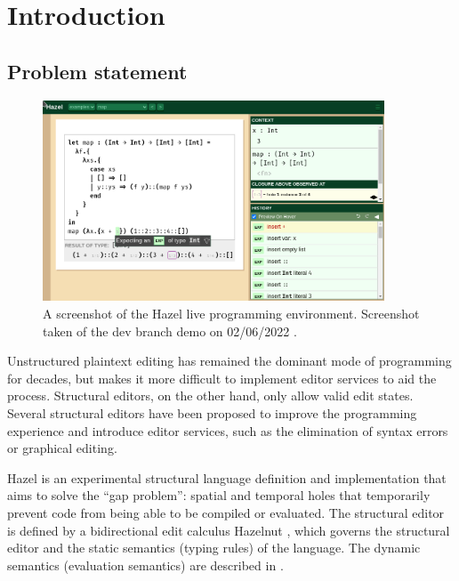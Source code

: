 \section{Introduction}
\label{sec:introduction}

\subsection{Problem statement}
\label{sec:prob_stmt}

\begin{figure}
  \centering
  \includegraphics[width=4in]{img/hazel_ui.png}
  \caption[Screenshot of the Hazel live programming environment.]{A screenshot of the Hazel live programming environment. Screenshot taken of the dev branch demo on 02/06/2022 \cite{HazelDemo2022}.}
  \label{fig:screenshot-hazel-ui}
\end{figure}

Unstructured plaintext editing has remained the dominant mode of programming for decades, but makes it more difficult to implement editor services to aid the process. Structural editors, on the other hand, only allow valid edit states. Several structural editors  have been proposed to improve the programming experience and introduce editor services, such as the elimination of syntax errors or graphical editing.

Hazel \cite{Hazel2022} is an experimental structural language definition and implementation that aims to solve the ``gap problem'': spatial and temporal holes that temporarily prevent code from being able to be compiled or evaluated. The structural editor is defined by a bidirectional edit calculus Hazelnut \cite{conf/popl/Hazelnut17}, which governs the structural editor and the static semantics (typing rules) of the language. The dynamic semantics (evaluation semantics) are described in \cite{conf/popl/HazelnutLive19}.


